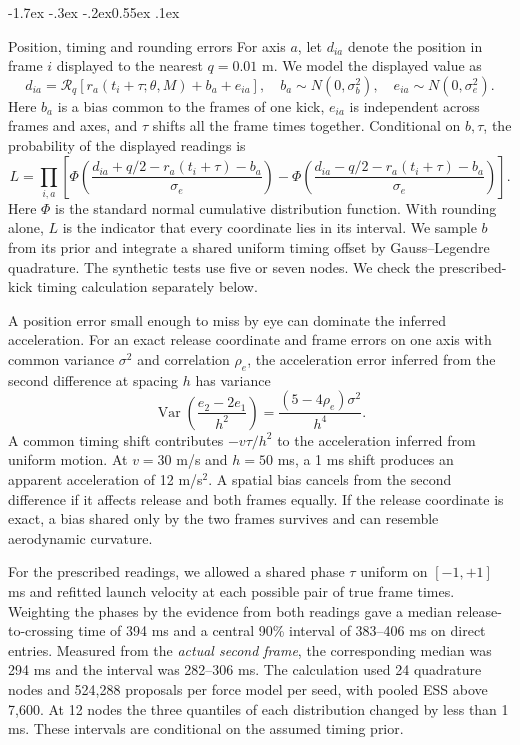 \documentclass[11pt,letterpaper]{article}
\makeatletter
\renewcommand{\subsection}{\reserveheadroom\@startsection{subsection}{2}{\z@}
  {-1.7ex \@plus -.3ex \@minus -.2ex}{0.55ex \@plus .1ex}
  {\normalfont\normalsize\sffamily\bfseries\color{black}\raggedright}}
\newcommand{\reserveheadroom}{\par\ifdim\dimexpr\pagegoal-\pagetotal\relax<5\baselineskip\newpage\fi}
\makeatother
\begin{document}
\subsection{Position, timing and rounding errors}
For axis \(a\), let \(d_{ia}\) denote the position in frame \(i\) displayed to the nearest \(q=0.01\) m. We model the displayed value as
\begin{equation}
 d_{ia}=\mathcal R_q\!\left[r_a(t_i+\tau;\theta,M)+b_a+e_{ia}\right],
 \quad b_a\sim N(0,\sigma_b^2),\quad e_{ia}\sim N(0,\sigma_e^2).
 \label{eq:observe}
\end{equation}
Here \(b_a\) is a bias common to the frames of one kick, \(e_{ia}\) is independent across frames and axes, and \(\tau\) shifts all the frame times together. Conditional on \(b,\tau\), the probability of the displayed readings is
\begin{equation}
 L=\prod_{i,a}\left[
 \Phi\!\left(\frac{d_{ia}+q/2-r_a(t_i+\tau)-b_a}{\sigma_e}\right)
 -\Phi\!\left(\frac{d_{ia}-q/2-r_a(t_i+\tau)-b_a}{\sigma_e}\right)\right].
 \label{eq:likelihood}
\end{equation}
Here \(\Phi\) is the standard normal cumulative distribution function. With rounding alone, \(L\) is the indicator that every coordinate lies in its interval. We sample \(b\) from its prior and integrate a shared uniform timing offset by Gauss--Legendre quadrature. The synthetic tests use five or seven nodes. We check the prescribed-kick timing calculation separately below.

A position error small enough to miss by eye can dominate the inferred acceleration. For an exact release coordinate and frame errors on one axis with common variance \(\sigma^2\) and correlation \(\rho_e\), the acceleration error inferred from the second difference at spacing \(h\) has variance
\begin{equation}
 \operatorname{Var}\!\left(\frac{e_2-2e_1}{h^2}\right)
   =\frac{(5-4\rho_e)\sigma^2}{h^4}.
 \label{eq:noise}
\end{equation}
A common timing shift contributes \(-v\tau/h^2\) to the acceleration inferred from uniform motion. At \(v=30\) m/s and \(h=50\) ms, a 1 ms shift produces an apparent acceleration of 12 m/s\(^2\). A spatial bias cancels from the second difference if it affects release and both frames equally. If the release coordinate is exact, a bias shared only by the two frames survives and can resemble aerodynamic curvature.

For the prescribed readings, we allowed a shared phase \(\tau\) uniform on \([-1,+1]\) ms and refitted launch velocity at each possible pair of true frame times. Weighting the phases by the evidence from both readings gave a median release-to-crossing time of 394 ms and a central 90\% interval of 383--406 ms on direct entries. Measured from the \emph{actual second frame}, the corresponding median was 294 ms and the interval was 282--306 ms. The calculation used 24 quadrature nodes and 524,288 proposals per force model per seed, with pooled ESS above 7,600. At 12 nodes the three quantiles of each distribution changed by less than 1 ms. These intervals are conditional on the assumed timing prior.
\end{document}
